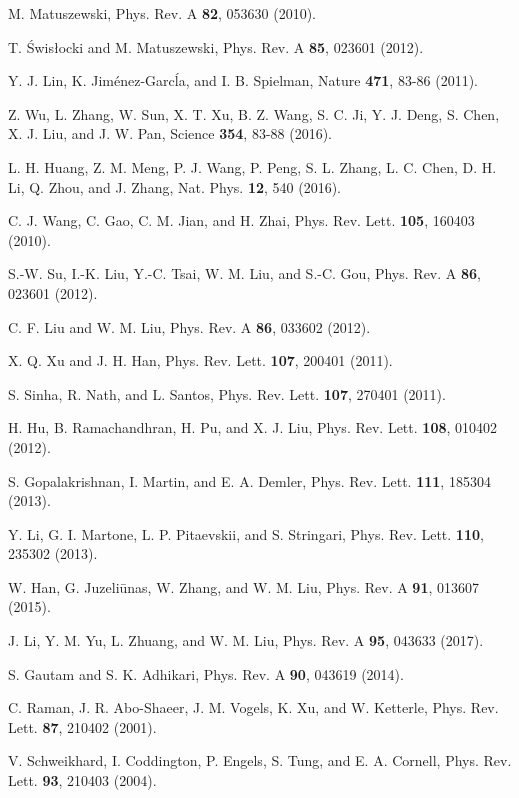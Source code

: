 \documentclass[aps,pra,showpacs,twocolumn,superscriptaddress]{revtex4-1}
\begin{document}
\begin{thebibliography}{99}
M. Matuszewski,
Phys. Rev. A \textbf{82}, 053630 (2010).

T. \'{S}wis{\l}ocki and M. Matuszewski,
Phys. Rev. A \textbf{85}, 023601 (2012).

Y. J. Lin, K. Jim\'{e}nez-Garc\'{l}a, and I. B. Spielman,
Nature \textbf{471}, 83-86 (2011).

Z. Wu, L. Zhang, W. Sun, X. T. Xu, B. Z. Wang, S. C. Ji, Y. J. Deng, S. Chen, X. J. Liu, and J. W. Pan,
Science \textbf{354}, 83-88 (2016).

L. H. Huang, Z. M. Meng, P. J. Wang, P. Peng, S. L. Zhang, L. C. Chen, D. H. Li, Q. Zhou, and J. Zhang,
Nat. Phys. \textbf{12}, 540 (2016).

C. J. Wang, C. Gao, C. M. Jian, and H. Zhai,
Phys. Rev. Lett. \textbf{105}, 160403 (2010).

S.-W. Su, I.-K. Liu, Y.-C. Tsai, W. M. Liu, and S.-C. Gou,
Phys. Rev. A \textbf{86}, 023601 (2012).

C. F. Liu and W. M. Liu,
Phys. Rev. A \textbf{86}, 033602 (2012).

X. Q. Xu and J. H. Han,
Phys. Rev. Lett. \textbf{107}, 200401 (2011).

S. Sinha, R. Nath, and L. Santos,
Phys. Rev. Lett. \textbf{107}, 270401 (2011).

H. Hu, B. Ramachandhran, H. Pu, and  X. J. Liu,
Phys. Rev. Lett. \textbf{108}, 010402 (2012).

S. Gopalakrishnan, I. Martin, and E. A. Demler,
Phys. Rev. Lett. \textbf{111}, 185304 (2013).

Y. Li, G. I. Martone,  L. P. Pitaevskii, and S. Stringari,
Phys. Rev. Lett. \textbf{110}, 235302 (2013).

W. Han, G. Juzeli\={u}nas, W. Zhang, and W. M. Liu,
Phys. Rev. A \textbf{91}, 013607 (2015).

J. Li, Y. M. Yu, L. Zhuang, and W. M. Liu,
Phys. Rev. A \textbf{95}, 043633 (2017).

S. Gautam and S. K. Adhikari,
Phys. Rev. A \textbf{90}, 043619 (2014).

C. Raman, J. R. Abo-Shaeer, J. M. Vogels, K. Xu, and W. Ketterle,
Phys. Rev. Lett. \textbf{87}, 210402 (2001).

V. Schweikhard, I. Coddington, P. Engels, S. Tung, and E. A. Cornell,
Phys. Rev. Lett. \textbf{93}, 210403 (2004).


\end{thebibliography}
\end{document}

